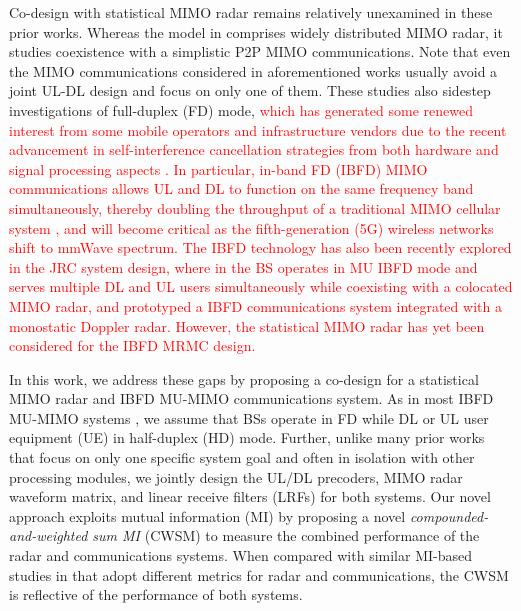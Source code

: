 \documentclass[10pt,journal]{IEEEtran}
\theoremstyle{definition}
\begin{document}
	Co-design with statistical MIMO radar remains relatively unexamined in these prior works. Whereas the model in \cite{he2019performance} comprises widely distributed MIMO radar, it studies coexistence with a simplistic P2P MIMO communications. Note that even the MIMO communications considered in aforementioned works usually avoid a joint UL-DL design and focus on only one of them. These studies also sidestep investigations of full-duplex (FD) mode, \textcolor{red}{which has generated some renewed interest from some mobile operators and infrastructure vendors due to the recent advancement in self-interference cancellation strategies from both hardware and signal processing aspects \cite{roberts2020millimeter}. In particular, in-band FD (IBFD) MIMO communications allows UL and DL to function on the same frequency band simultaneously, thereby doubling the throughput of a traditional MIMO cellular system \cite{roberts2020millimeter,Hassani2020IBFD,FD_WMMSE}, and will become critical as the fifth-generation (5G) wireless networks shift to mmWave spectrum\cite{roberts2020millimeter}. %
		The IBFD technology has also been recently explored in the JRC system design, where in \cite{biswas2018fdqos} the BS operates in MU IBFD mode and serves multiple DL and UL users simultaneously while coexisting with a colocated MIMO radar, and \cite{Hassani2020IBFD} prototyped a IBFD communications system integrated with a monostatic Doppler radar. However, the statistical MIMO radar has yet been considered for the IBFD MRMC design. } 
	
	In this work, we address these gaps by proposing a co-design for a statistical MIMO radar and IBFD MU-MIMO communications system. As in most IBFD MU-MIMO systems \cite{biswas2018fdqos,singh2018transceiver,FD_WMMSE}, we assume that BSs operate in FD while DL or UL user equipment (UE) in half-duplex (HD) mode. Further, unlike many prior works that focus on only one specific system goal and often in isolation with other processing modules, we jointly design the UL/DL precoders, MIMO radar waveform matrix, and linear receive filters (LRFs) for both systems. Our novel approach exploits mutual information (MI) by proposing a novel \textit{compounded-and-weighted sum MI} (CWSM) to measure the combined performance of the radar and communications systems. When compared with similar MI-based studies in \cite{biswas2018fdqos,singh2018transceiver,he2019performance} that adopt different metrics for radar and communications, the CWSM is reflective of the performance of both systems. 
	
\end{document}
